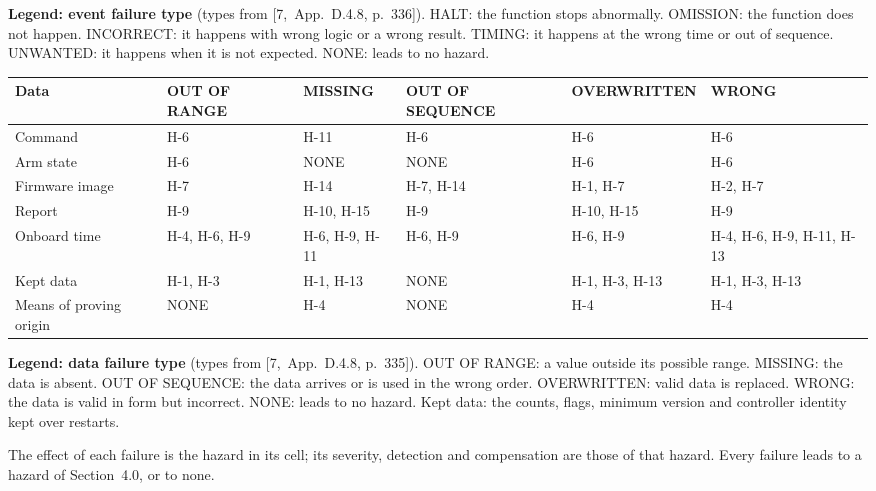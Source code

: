 \documentclass[11pt,a4paper]{article}
\begin{document}
\noindent\textbf{Legend: event failure type} (types from [7,~App.~D.4.8,
p.~336]). HALT: the function stops abnormally. OMISSION: the function does not
happen. INCORRECT: it happens with wrong logic or a wrong result. TIMING: it
happens at the wrong time or out of sequence. UNWANTED: it happens when it is
not expected. NONE: leads to no hazard.

{\footnotesize
\begin{xltabular}{\textwidth}{@{}>{\raggedright\arraybackslash}X*{3}{>{\raggedright\arraybackslash}p{2.2cm}}*{2}{>{\raggedright\arraybackslash}p{2.65cm}}@{}}
\toprule
Data & OUT OF RANGE & MISSING & OUT OF SEQUENCE & OVERWRITTEN & WRONG \\
\midrule
\endhead
Command & H-6 & H-11 & H-6 & H-6 & H-6 \\
Arm state & H-6 & NONE & NONE & H-6 & H-6 \\
Firmware image & H-7 & H-14 & H-7, H-14 & H-1, H-7 & H-2, H-7 \\
Report & H-9 & H-10, H-15 & H-9 & H-10, H-15 & H-9 \\
Onboard time & H-4, H-6, H-9 & H-6, H-9, H-11 & H-6, H-9 & H-6, H-9 & H-4, H-6, H-9, H-11, H-13 \\
Kept data & H-1, H-3 & H-1, H-13 & NONE & H-1, H-3, H-13 & H-1, H-3, H-13 \\
Means of proving origin & NONE & H-4 & NONE & H-4 & H-4 \\
\bottomrule
\end{xltabular}}

\noindent\textbf{Legend: data failure type} (types from [7,~App.~D.4.8,
p.~335]). OUT OF RANGE: a value outside its possible range. MISSING: the data
is absent. OUT OF SEQUENCE: the data arrives or is used in the wrong order.
OVERWRITTEN: valid data is replaced. WRONG: the data is valid in form but
incorrect. NONE: leads to no hazard. Kept data: the counts, flags, minimum
version and controller identity kept over restarts.

\medskip
The effect of each failure is the hazard in its cell; its severity, detection
and compensation are those of that hazard. Every failure leads to a hazard of
Section~4.0, or to none.
\end{document}
